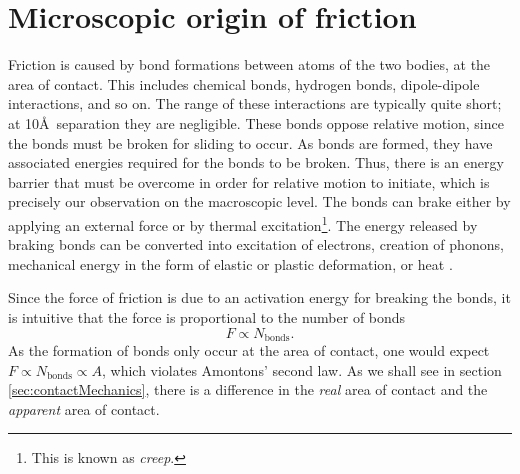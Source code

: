 \documentclass[twoside,english]{uiofysmaster}
\begin{document}
\section{Microscopic origin of friction}
Friction is caused by bond formations between atoms of the two bodies, at the area of contact. 
This includes chemical bonds, hydrogen bonds, dipole-dipole interactions, and so on.  
The range of these interactions are typically quite short; at 10\AA ~separation they are negligible.
These bonds oppose relative motion, since the bonds must be broken for sliding to occur.
As bonds are formed, they have associated energies required for the bonds to be broken. 
Thus, there is an energy barrier that must be overcome in order for relative motion to initiate,
which is precisely our observation on the macroscopic level. 
The bonds can brake either by applying an external force or by thermal excitation\footnote{This is known as \textit{creep}.}.
The energy released by braking bonds can be converted into excitation of electrons, creation of phonons, mechanical energy in the form of elastic or plastic deformation, or heat \cite{Introduction2Friction}.

Since the force of friction is due to an activation energy for breaking the bonds, it is intuitive that the force is proportional to the number of bonds
\begin{equation}
F \propto N_{\text{bonds}}.
\end{equation} 
As the formation of bonds only occur at the area of contact, one would expect $F\propto N_\text{bonds}\propto A$, which violates Amontons' second law. 
As we shall see in section \ref{sec:contactMechanics}, there is a difference in the \textit{real} area of contact and the \textit{apparent} area of contact.

%		
\end{document}
